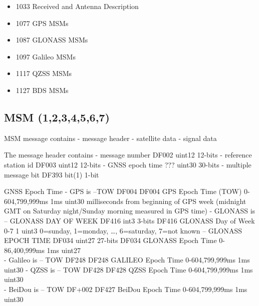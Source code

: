 %

\begin{itemize}
\item
  1033 Received and Antenna Description
\item
  1077 GPS MSMs
\item
  1087 GLONASS MSMs
\item
  1097 Galileo MSMs
\item
  1117 QZSS MSMs
\item
  1127 BDS MSMs
\end{itemize}

\subsection{MSM (1,2,3,4,5,6,7)}\label{msm-1234567}

MSM message contains - message header - satellite data - signal data

The message header contains - message number DF002 uint12 12-bits -
reference station id DF003 uint12 12-bits - GNSS epoch time ??? uint30
30-bits - multiple message bit DF393 bit(1) 1-bit

GNSS Epoch Time - GPS is --TOW DF004 DF004 GPS Epoch Time (TOW)
0-604,799,999ms 1ms uint30 milliseconds from beginning of GPS week
(midnight GMT on Saturday night/Sunday morning measured in GPS time) -
GLONASS is -- GLONASS DAY OF WEEK DF416 int3 3-bits DF416 GLONASS Day of
Week 0-7 1 uint3 0=sunday, 1=monday, \ldots{}, 6=saturday, 7=not known
-- GLONASS EPOCH TIME DF034 uint27 27-bits DF034 GLONASS Epoch Time
0-86,400,999ms 1ms uint27\\
- Galileo is -- TOW DF248 DF248 GALILEO Epoch Time 0-604,799,999ms 1ms
uint30 - QZSS is -- TOW DF428 DF428 QZSS Epoch Time 0-604,799,999ms 1ms
uint30\\
- BeiDou is -- TOW DF+002 DF427 BeiDou Epoch Time 0-604,799,999ms 1ms
uint30

